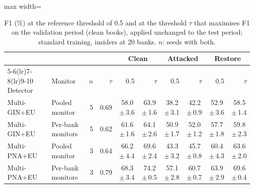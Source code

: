 \begin{table}[!htbp]\centering\small\setlength{\tabcolsep}{4pt}
\caption{F1 (\%) at the reference threshold of 0.5 and at the threshold $\tau$ that maximises F1 on the validation period (clean books), applied unchanged to the test period; standard training, insiders at 20 banks. $n$: seeds with both.}\label{tab:amlthr}
\begin{adjustbox}{max width=\linewidth}\begin{tabular}{llrrrrrrrr}\toprule
 & & & & \multicolumn{2}{c}{Clean} & \multicolumn{2}{c}{Attacked} & \multicolumn{2}{c}{Restore} \\\cmidrule(lr){5-6}\cmidrule(lr){7-8}\cmidrule(lr){9-10}
Detector & Monitor & $n$ & $\tau$ & 0.5 & $\tau$ & 0.5 & $\tau$ & 0.5 & $\tau$ \\\midrule
Multi-GIN+EU & Pooled monitor & 5 & 0.69 & 58.0\,$\pm$\,3.6 & 63.9\,$\pm$\,1.6 & 38.2\,$\pm$\,3.1 & 42.2\,$\pm$\,0.9 & 52.9\,$\pm$\,3.6 & 58.5\,$\pm$\,1.4 \\
Multi-GIN+EU & Per-bank monitors & 5 & 0.62 & 61.6\,$\pm$\,1.6 & 64.1\,$\pm$\,2.6 & 50.9\,$\pm$\,1.7 & 52.0\,$\pm$\,1.2 & 57.7\,$\pm$\,1.8 & 59.8\,$\pm$\,2.3 \\
Multi-PNA+EU & Pooled monitor & 3 & 0.64 & 66.2\,$\pm$\,4.4 & 69.6\,$\pm$\,2.4 & 43.3\,$\pm$\,3.2 & 45.7\,$\pm$\,0.8 & 60.4\,$\pm$\,4.3 & 63.6\,$\pm$\,2.0 \\
Multi-PNA+EU & Per-bank monitors & 3 & 0.79 & 68.3\,$\pm$\,3.4 & 74.2\,$\pm$\,0.5 & 57.1\,$\pm$\,2.8 & 60.7\,$\pm$\,0.7 & 63.9\,$\pm$\,2.9 & 69.6\,$\pm$\,0.4 \\
\bottomrule\end{tabular}\end{adjustbox}\end{table}